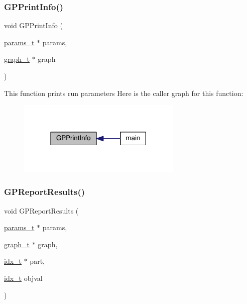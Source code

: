 \subsubsection{\texorpdfstring{G\+P\+Print\+Info()}{GPPrintInfo()}}
{\footnotesize\ttfamily void G\+P\+Print\+Info (\begin{DoxyParamCaption}\item[{\hyperlink{a00706}{params\+\_\+t} $\ast$}]{params,  }\item[{\hyperlink{a00734}{graph\+\_\+t} $\ast$}]{graph }\end{DoxyParamCaption})}

This function prints run parameters Here is the caller graph for this function\+:\nopagebreak
\begin{figure}[H]
\begin{center}
\leavevmode
\includegraphics[width=222pt]{a00948_a621f3f8c2f9b93614ecb2fdf86a6cc53_icgraph}
\end{center}
\end{figure}
\mbox{\label{a00948_aee005b8826ce55da90165e4a207f8f03}} 
\subsubsection{\texorpdfstring{G\+P\+Report\+Results()}{GPReportResults()}}
{\footnotesize\ttfamily void G\+P\+Report\+Results (\begin{DoxyParamCaption}\item[{\hyperlink{a00706}{params\+\_\+t} $\ast$}]{params,  }\item[{\hyperlink{a00734}{graph\+\_\+t} $\ast$}]{graph,  }\item[{\hyperlink{a00876_aaa5262be3e700770163401acb0150f52}{idx\+\_\+t} $\ast$}]{part,  }\item[{\hyperlink{a00876_aaa5262be3e700770163401acb0150f52}{idx\+\_\+t}}]{objval }\end{DoxyParamCaption})}

